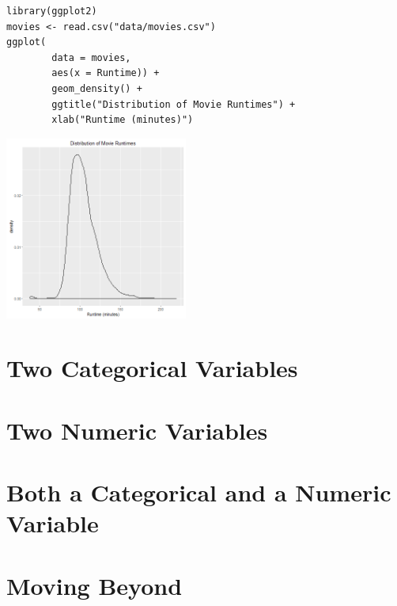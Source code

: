 \documentclass[a4paper, captions=tableheading]{tufte-book}
\begin{document}
\begin{verbatim}
library(ggplot2)
movies <- read.csv("data/movies.csv")
ggplot(
		data = movies,
		aes(x = Runtime)) +
		geom_density() +
		ggtitle("Distribution of Movie Runtimes") +
		xlab("Runtime (minutes)")
\end{verbatim}

\includegraphics[height=6cm]{img/1-num-ggplot2-04.png}

\section{Two Categorical Variables}
\label{sec:orgheadline11}

\section{Two Numeric Variables}
\label{sec:orgheadline12}

\section{Both a Categorical and a Numeric Variable}
\label{sec:orgheadline13}

\section{Moving Beyond}
\label{sec:orgheadline14}
\end{document}

